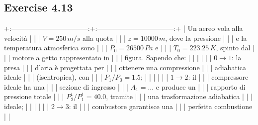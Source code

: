 \documentclass[letterpaper,10pt,italian]{jupyterBook}
\begin{document}
\subsection{Exercise 4.13}
\label{\detokenize{polimi/fluidmechanics-ita/template/capitoli/04_bilanci/04e03in:exercise-4-13}}\label{\detokenize{polimi/fluidmechanics-ita/template/capitoli/04_bilanci/04e03in:fluid-mechanics-balances-ex-13}}\label{\detokenize{polimi/fluidmechanics-ita/template/capitoli/04_bilanci/04e03in::doc}}
\sphinxAtStartPar
+:———————————:+:———————————:+
| Un aereo vola alla velocità       |                                   |
| \(V=250 \, m/s\) alla quota         |                                   |
| \(z=10000 \, m\), dove la pressione |                                   |
| e la temperatura atmosferica sono |                                   |
| \(P_0 = 26500 \, Pa\) e             |                                   |
| \(T_0 = 223.25 \, K\), spinto dal   |                                   |
| motore a getto rappresentato in   |                                   |
| figura. Sapendo che:              |                                   |
|                                   |                                   |
| \sphinxhyphen{}   \(0 \rightarrow 1\): la presa   |                                   |
|     d’aria è progettata per       |                                   |
|     ottenere una compressione     |                                   |
|     adiabatica ideale             |                                   |
|     (isentropica), con            |                                   |
|     \(P_1/P_0 = 1.5\);              |                                   |
|                                   |                                   |
| \sphinxhyphen{}   \(1 \rightarrow 2\): il         |                                   |
|     compressore ideale ha una     |                                   |
|     sezione di ingresso           |                                   |
|     \(A_1 = \dots\) e produce un    |                                   |
|     rapporto di pressione totale  |                                   |
|     \(P_2^t/P_1^t = 40.0\), tramite |                                   |
|     una trasformazione adiabatica |                                   |
|     ideale;                       |                                   |
|                                   |                                   |
| \sphinxhyphen{}   \(2 \rightarrow 3\): il         |                                   |
|     combustore garantisce una     |                                   |
|     perfetta combustione          |                                   |
\end{document}
